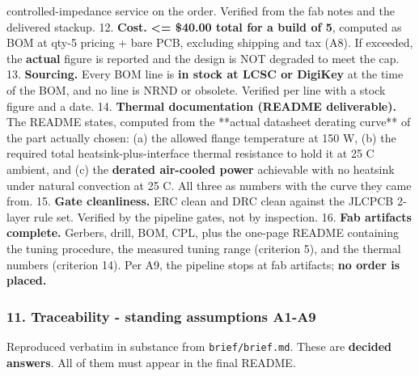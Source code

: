 \documentclass[11pt,a4paper]{article}
\begin{document}
controlled-impedance service on the order. Verified from the fab notes and the delivered stackup. 12. \textbf{Cost.} \textbf{\textless{}= \$40.00 total for a build of 5}, computed as BOM at qty-5 pricing + bare PCB, excluding shipping and tax (A8). If exceeded, the \textbf{actual} figure is reported and the design is NOT degraded to meet the cap. 13. \textbf{Sourcing.} Every BOM line is \textbf{in stock at LCSC or DigiKey} at the time of the BOM, and no line is NRND or obsolete. Verified per line with a stock figure and a date. 14. \textbf{Thermal documentation (README deliverable).} The README states, computed from the {*}{*}actual datasheet derating curve{*}{*} of the part actually chosen: (a) the allowed flange temperature at 150 W, (b) the required total heatsink-plus-interface thermal resistance to hold it at 25 C ambient, and (c) the \textbf{derated air-cooled power} achievable with no heatsink under natural convection at 25 C. All three as numbers with the curve they came from. 15. \textbf{Gate cleanliness.} ERC clean and DRC clean against the JLCPCB 2-layer rule set. Verified by the pipeline gates, not by inspection. 16. \textbf{Fab artifacts complete.} Gerbers, drill, BOM, CPL, plus the one-page README containing the tuning procedure, the measured tuning range (criterion 5), and the thermal numbers (criterion 14). Per A9, the pipeline stops at fab artifacts; \textbf{no order is placed.}

\subsubsection*{11. Traceability - standing assumptions A1-A9}
Reproduced verbatim in substance from \texttt{brief/brief.md}. These are \textbf{decided answers}. All of them must appear in the final README.
\end{document}
